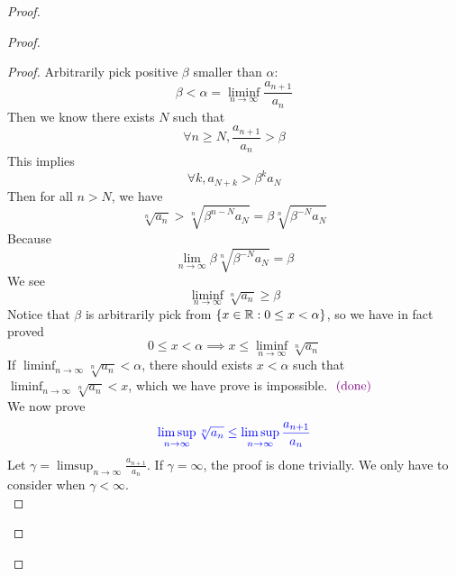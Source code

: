 \documentclass{report}
\begin{document}
\begin{proof}
\begin{proof}
\begin{proof}
Arbitrarily pick positive $\beta $ smaller than $\alpha $:
\begin{equation}
\beta <\alpha=\liminf_{n\to\infty} \frac{a_{n+1}}{a_n}
\end{equation}
Then we know there exists $N$ such that
 \begin{equation}
\forall n\geq N, \frac{a_{n+1}}{a_n}>\beta 
\end{equation}
This implies 
\begin{equation}
\forall k, a_{N+k}>\beta^k a_N
\end{equation}
Then for all $n>N$, we have
 \begin{equation}
   \sqrt[n]{a_n}>\sqrt[n]{ \beta^{n-N}a_{N}}=\beta \sqrt[n]{\beta^{-N}a_N} 
\end{equation}
Because 
\begin{equation}
\lim_{n\to\infty}\beta \sqrt[n]{\beta^{-N}a_N}=\beta 
\end{equation}
We see
\begin{equation}
\liminf_{n\to\infty} \sqrt[n]{a_n} \geq \beta 
\end{equation} 
Notice that $\beta $ is arbitrarily pick from $\{ x\in\mathbb{R}: 0\leq x<\alpha  \}$, so we have in fact proved
\begin{equation}
0\leq x<\alpha \implies x\leq \liminf_{n\to\infty} \sqrt[n]{a_n} 
\end{equation}
If $\liminf_{n\to\infty} \sqrt[n]{a_n} <\alpha $, there should exists $x<\alpha $ such that $\liminf_{n\to\infty} \sqrt[n]{a_n} <x$, which we have prove is impossible. $\textcolor{violet}{\text{ (done) }}$\\

We now prove 
\begin{equation}
\textcolor{blue}{\limsup_{n\to\infty} \sqrt[n]{a_n}\leq \limsup_{n\to\infty} \frac{a_{n+1}}{a_n}}
\end{equation}
Let $\gamma =\limsup_{n\to\infty} \frac{a_{n+1}}{a_n}$.  If $\gamma =\infty$, the proof is done trivially. We only have to consider when $\gamma<\infty$.\\


\end{proof}
\end{proof}
\end{proof}
\end{document}
